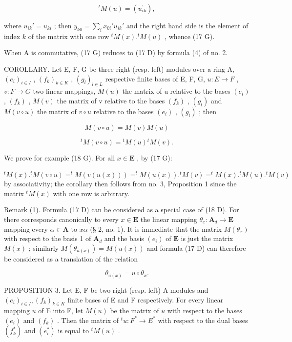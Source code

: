 \[
{ } ^ { t } M ( u ) = \left( u _ { i k } ^ { \prime } \right) ,
\]

where \(u_{ik}' = u_{ki}\) ; then \(y_{k0} = \sum_{i} x_{0i}' u_{ik}'\) and the right hand side is the element of index \(k\) of the matrix with one row \(^t M(x).^t M(u)\) , whence (17 G).

When A is commutative, (17 G) reduces to (17 D) by formula (4) of no. 2.

COROLLARY. Let E, F, G be three right (resp. left) modules over a ring A, \((e_{i})_{i\in I}\) , \((f_{k})_{k\in K}\) , \((g_{l})_{l\in L}\) respective finite bases of E, F, G, \(u:E\to F\) , \(v:F\to G\) two linear mappings, \(M(u)\) the matrix of u relative to the bases \((e_{i})\) , \((f_{k})\) , \(M(v)\) the matrix of v relative to the bases \((f_{k})\) , \((g_{l})\) and \(M(v\circ u)\) the matrix of \(v\circ u\) relative to the bases \((e_{i})\) , \((g_{l})\) ; then

\[
M (v \circ u) = M (v) M (u)\tag{18 D}
\]

\[
{ } ^ { t } M ( v \circ u ) = { } ^ { t } M ( u ) { } ^ { t } M ( v ) .\tag{18 G}
\]

We prove for example (18 G). For all \(x \in \mathbf{E}\) , by (17 G):

\(^{t}M(x).^{t}M(v\circ u)=^{t}M(v(u(x)))=^{t}M(u(x)).^{t}M(v)=^{t}M(x).^{t}M(u).^{t}M(v)\) by associativity; the corollary then follows from no. 3, Proposition 1 since the matrix \(^{t}M(x)\) with one row is arbitrary.

Remark (1). Formula (17 D) can be considered as a special case of (18 D). For there corresponds canonically to every \(x \in \mathbf{E}\) the linear mapping \(\theta_x: \mathbf{A}_d \to \mathbf{E}\) mapping every \(\alpha \in \mathbf{A}\) to \(x\alpha\) (§ 2, no. 1). It is immediate that the matrix \(M(\theta_x)\) with respect to the basis 1 of \(\mathbf{A}_d\) and the basis \((e_i)\) of \(\mathbf{E}\) is just the matrix \(M(x)\) ; similarly \(M(\theta_{u(x)}) = M(u(x))\) and formula (17 D) can therefore be considered as a translation of the relation

\[
\theta_ {u (x)} = u \circ \theta_ {x}.
\]

PROPOSITION 3. Let E, F be two right (resp. left) A-modules and \((e_i)_{i\in I}, (f_k)_{k\in K}\) finite bases of E and F respectively. For every linear mapping \(u\) of E into F, let \(M(u)\) be the matrix of \(u\) with respect to the bases \((e_i)\) and \((f_k)\) . Then the matrix of \(^t u: F^* \to E^*\) with respect to the dual bases \((f_k^*)\) and \((e_i^*)\) is equal to \(^t M(u)\) .


